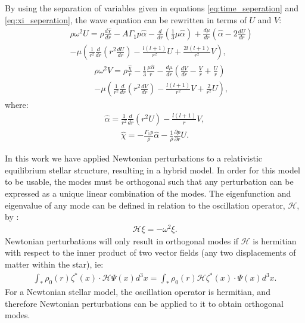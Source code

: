 \documentclass[fleqn,usenatbib]{mnras}
\begin{document}
\hspace{\parindent}By using the separation of variables given in equations \ref{eq:time_seperation} and \ref{eq:xi_seperation}, the wave equation can be rewritten in terms of $U$ and $V$: 
\begin{align}\nonumber
&&\rho\omega^2U=\rho\frac{d\hat{\chi}}{dr}-A\Gamma_1 p\hat{\alpha}-\frac{d}{dr}\left(\frac{1}{3}\mu\hat{\alpha}\right)+\frac{d\mu}{dr}\left(\hat{\alpha}-2\frac{dU}{dr}\right)\\
&&-\mu\left(\frac{1}{r^2}\frac{d}{dr}\left( r^2\frac{dU}{dr}\right)-\frac{l(l+1)}{r^2}U+\frac{2l(l+1)}{r^2}V\right),
\label{eq:Ueqn}
\end{align}
\begin{align}\nonumber
&&\rho\omega^2V=\rho\frac{\hat{\chi}}{r}-\frac{1}{3}\frac{\mu\hat{\alpha}}{r}-\frac{d\mu}{dr}\left(\frac{dV}{dr}-\frac{V}{r}+\frac{U}{r}\right)\\
&&-\mu\left(\frac{1}{r^2}\frac{d}{dr}\left(r^2\frac{dV}{dr}\right)-\frac{l(l+1)}{r^2}V+\frac{2}{r^2}U\right),
\label{eq:Veqn}
\end{align}
\noindent where:
\begin{align}
\hat{\alpha}=\frac{1}{r^2}\frac{d}{dr}(r^2U)-\frac{l(l+1)}{r}V,
\label{eq:alphahat}
\end{align}
\begin{align}
\hat{\chi}=-\frac{\Gamma_1p}{\rho}\hat{\alpha}-\frac{1}{\rho}\frac{\partial p}{\partial r}U.
\label{eq:chihat}
\end{align}








\hspace{\parindent}In this work we have applied Newtonian perturbations to a relativistic equilibrium stellar structure, resulting in a hybrid model. In order for this model to be usable, the modes must be orthogonal such that any perturbation can be expressed as a unique linear combination of the modes. The eigenfunction and eigenvalue of any mode can be defined in relation to the oscillation operator, $\mathcal{H}$, by \citet{reisenegger1994multipole}:
\begin{align}
\mathcal{H}\xi=-\omega^2\xi.
\end{align}
\noindent Newtonian perturbations will only result in orthogonal modes if $\mathcal{H}$ is hermitian with respect to the inner product of two vector fields (any two displacements of matter within the star), ie:
\begin{align}
\int_*\rho_0(r)\zeta^*(x)\cdot\mathcal{H}\Psi(x)d^3x=\int_*\rho_0(r)\mathcal{H}\zeta^*(x)\cdot\Psi(x)d^3x.
\end{align}
\noindent For a Newtonian stellar model, the oscillation operator is hermitian, and therefore Newtonian perturbations can be applied to it to obtain orthogonal modes. 
\end{document}
